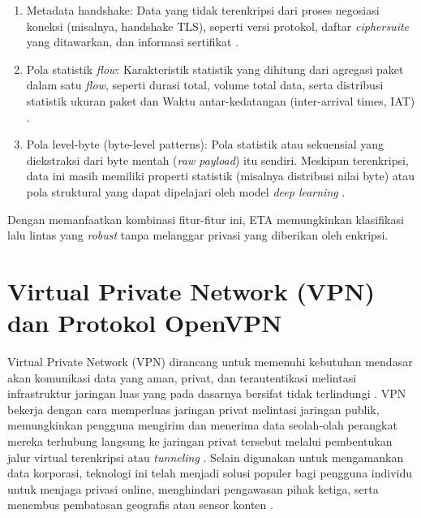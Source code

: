 \begin{enumerate}
  \item Metadata handshake: Data yang tidak terenkripsi dari proses negosiasi koneksi (misalnya, handshake TLS), seperti versi protokol, daftar \textit{ciphersuite} yang ditawarkan, dan informasi sertifikat \citep{anderson2018deciphering}.

  \item Pola statistik \textit{flow}: Karakteristik statistik yang dihitung dari agregasi paket dalam satu \textit{flow}, seperti durasi total, volume total data, serta distribusi statistik ukuran paket dan Waktu antar-kedatangan (inter-arrival times, IAT) \citep{azab2024network, dainotti2012issues}.

  \item Pola level-byte (byte-level patterns): Pola statistik atau sekuensial yang diekstraksi dari byte mentah (\textit{raw payload}) itu sendiri. Meskipun terenkripsi, data ini masih memiliki properti statistik (misalnya distribusi nilai byte) atau pola struktural yang dapat dipelajari oleh model \textit{deep learning} \citep{anderson2018deciphering}.
\end{enumerate}

Dengan memanfaatkan kombinasi fitur-fitur ini, ETA memungkinkan klasifikasi lalu lintas yang \textit{robust} tanpa melanggar privasi yang diberikan oleh enkripsi.

\section{Virtual Private Network (VPN) dan Protokol OpenVPN}
\label{sec:bab2-vpn-openvpn}

Virtual Private Network (VPN) dirancang untuk memenuhi kebutuhan mendasar akan komunikasi data yang aman, privat, dan terautentikasi melintasi infrastruktur jaringan luas yang pada dasarnya bersifat tidak terlindungi \citep{crist2015mastering}. VPN bekerja dengan cara memperluas jaringan privat melintasi jaringan publik, memungkinkan pengguna mengirim dan menerima data seolah-olah perangkat mereka terhubung langsung ke jaringan privat tersebut melalui pembentukan jalur virtual terenkripsi atau \textit{tunneling} \citep{DraperGil2016}. Selain digunakan untuk mengamankan data korporasi, teknologi ini telah menjadi solusi populer bagi pengguna individu untuk menjaga privasi online, menghindari pengawasan pihak ketiga, serta menembus pembatasan geografis atau sensor konten \citep{DraperGil2016}.

